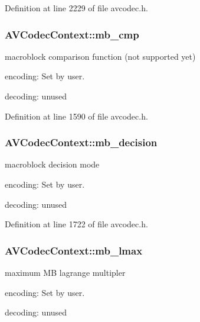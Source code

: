 Definition at line 2229 of file avcodec.\+h.

\subsubsection[{\texorpdfstring{mb\+\_\+cmp}{mb_cmp}}]{ A\+V\+Codec\+Context\+::mb\+\_\+cmp}\hypertarget{struct_a_v_codec_context_a99286e29b23e56cc65f7877102ee876f}{}\label{struct_a_v_codec_context_a99286e29b23e56cc65f7877102ee876f}
macroblock comparison function (not supported yet)
\begin{DoxyItemize}
\item encoding\+: Set by user.
\item decoding\+: unused 
\end{DoxyItemize}

Definition at line 1590 of file avcodec.\+h.

\subsubsection[{\texorpdfstring{mb\+\_\+decision}{mb_decision}}]{ A\+V\+Codec\+Context\+::mb\+\_\+decision}\hypertarget{struct_a_v_codec_context_a66af0e26734255f1eacabd7d67558482}{}\label{struct_a_v_codec_context_a66af0e26734255f1eacabd7d67558482}
macroblock decision mode
\begin{DoxyItemize}
\item encoding\+: Set by user.
\item decoding\+: unused 
\end{DoxyItemize}

Definition at line 1722 of file avcodec.\+h.

\subsubsection[{\texorpdfstring{mb\+\_\+lmax}{mb_lmax}}]{ A\+V\+Codec\+Context\+::mb\+\_\+lmax}\hypertarget{struct_a_v_codec_context_a3ec9ca08ce8cbc916ff71b6664a50428}{}\label{struct_a_v_codec_context_a3ec9ca08ce8cbc916ff71b6664a50428}
maximum MB lagrange multipler
\begin{DoxyItemize}
\item encoding\+: Set by user.
\item decoding\+: unused 
\end{DoxyItemize}

